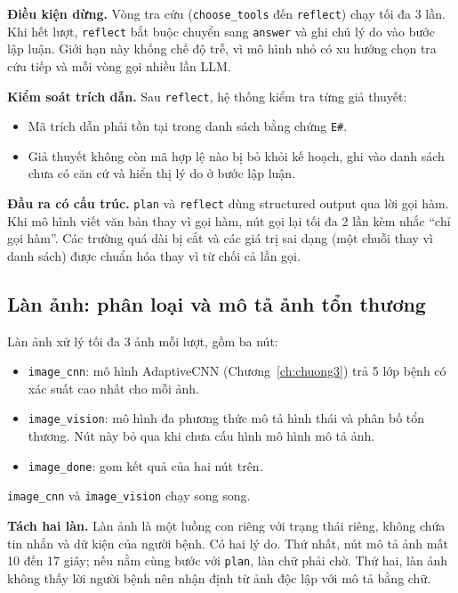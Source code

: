 \textbf{Điều kiện dừng.} Vòng tra cứu (\texttt{choose\_tools} đến \texttt{reflect}) chạy tối đa 3 lần. Khi hết lượt, \texttt{reflect} bắt buộc chuyển sang \texttt{answer} và ghi chú lý do vào bước lập luận. Giới hạn này khống chế độ trễ, vì mô hình nhỏ có xu hướng chọn tra cứu tiếp và mỗi vòng gọi nhiều lần LLM.

\textbf{Kiểm soát trích dẫn.} Sau \texttt{reflect}, hệ thống kiểm tra từng giả thuyết:
\begin{itemize}
  \item Mã trích dẫn phải tồn tại trong danh sách bằng chứng \texttt{E\#}.
  \item Giả thuyết không còn mã hợp lệ nào bị bỏ khỏi kế hoạch, ghi vào danh sách chưa có căn cứ và hiển thị lý do ở bước lập luận.
\end{itemize}

\textbf{Đầu ra có cấu trúc.} \texttt{plan} và \texttt{reflect} dùng structured output qua lời gọi hàm. Khi mô hình viết văn bản thay vì gọi hàm, nút gọi lại tối đa 2 lần kèm nhắc ``chỉ gọi hàm''. Các trường quá dài bị cắt và các giá trị sai dạng (một chuỗi thay vì danh sách) được chuẩn hóa thay vì từ chối cả lần gọi.

\subsection{Làn ảnh: phân loại và mô tả ảnh tổn thương}

Làn ảnh xử lý tối đa 3 ảnh mỗi lượt, gồm ba nút:
\begin{itemize}
  \item \texttt{image\_cnn}: mô hình AdaptiveCNN (Chương~\ref{ch:chuong3}) trả 5 lớp bệnh có xác suất cao nhất cho mỗi ảnh.
  \item \texttt{image\_vision}: mô hình đa phương thức mô tả hình thái và phân bố tổn thương. Nút này bỏ qua khi chưa cấu hình mô hình mô tả ảnh.
  \item \texttt{image\_done}: gom kết quả của hai nút trên.
\end{itemize}

\texttt{image\_cnn} và \texttt{image\_vision} chạy song song.

\textbf{Tách hai làn.} Làn ảnh là một luồng con riêng với trạng thái riêng, không chứa tin nhắn và dữ kiện của người bệnh. Có hai lý do. Thứ nhất, nút mô tả ảnh mất 10 đến 17 giây; nếu nằm cùng bước với \texttt{plan}, làn chữ phải chờ. Thứ hai, làn ảnh không thấy lời người bệnh nên nhận định từ ảnh độc lập với mô tả bằng chữ.

